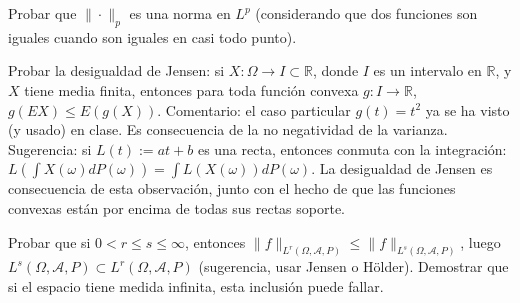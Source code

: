 
\begin{problem}[8]Probar que $\|\cdot\|_p$ es una norma en $L^p$ (considerando que dos funciones
son iguales
cuando son iguales en casi todo punto).
\solution

\begin{expla}

\end{expla}

\end{problem}


\begin{problem}[9]Probar la desigualdad de Jensen: si $X:\Omega\to I\subset \mathbb{R}$, donde
$I$ es un intervalo en $\mathbb{R}$, y $X$ tiene media finita, entonces para toda funci\'on
convexa $g:I\to \mathbb{R}$, $g(EX) \le E(g(X))$. Comentario: el caso particular $g(t) = t^2$
ya se ha visto (y usado) en clase. Es consecuencia de la no negatividad de la varianza.
Sugerencia: si $L(t) := a t + b$ es una recta, entonces conmuta con la integraci\'on:
$L(\int X(\omega) dP (\omega)) = \int L (X(\omega)) dP (\omega)$. La desigualdad de Jensen
es consecuencia de esta observaci\'on, junto con el hecho de que las funciones convexas
est\'an por encima de todas sus rectas soporte.
\solution

\begin{expla}

\end{expla}

\end{problem}


\begin{problem}[10]Probar que si $0 < r\le s \le \infty$,
 entonces $\|f\|_{L^r(\Omega, \mathcal{A}, P)}\le \|f\|_{L^s(\Omega, \mathcal{A}, P)}$, luego $L^s(\Omega, \mathcal{A}, P) \subset L^r(\Omega, \mathcal{A}, P)$ (sugerencia, usar Jensen o H\"older). Demostrar que si el espacio tiene medida infinita, esta
inclusi\'on puede fallar.
\solution

\begin{expla}

\end{expla}

\end{problem}

